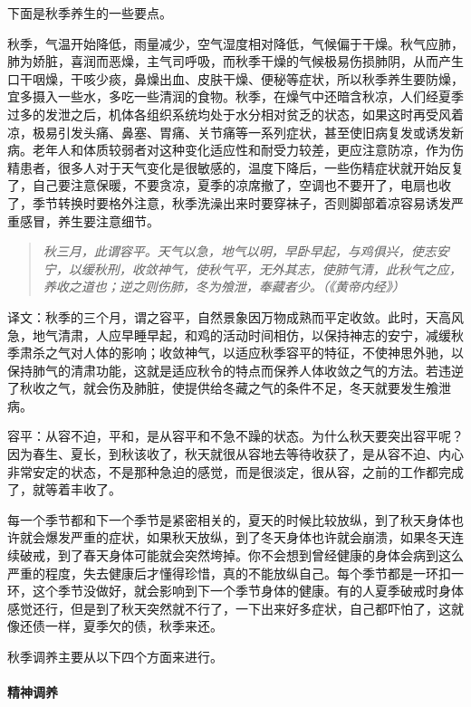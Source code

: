 下面是秋季养生的一些要点。

秋季，气温开始降低，雨量减少，空气湿度相对降低，气候偏于干燥。秋气应肺，肺为娇脏，喜润而恶燥，主气司呼吸，而秋季干燥的气候极易伤损肺阴，从而产生口干咽燥，干咳少痰，鼻燥出血、皮肤干燥、便秘等症状，所以秋季养生要防燥，宜多摄入一些水，多吃一些清润的食物。秋季，在燥气中还暗含秋凉，人们经夏季过多的发泄之后，机体各组织系统均处于水分相对贫乏的状态，如果这时再受风着凉，极易引发头痛、鼻塞、胃痛、关节痛等一系列症状，甚至使旧病复发或诱发新病。老年人和体质较弱者对这种变化适应性和耐受力较差，更应注意防凉，作为伤精患者，很多人对于天气变化是很敏感的，温度下降后，一些伤精症状就开始反复了，自己要注意保暖，不要贪凉，夏季的凉席撤了，空调也不要开了，电扇也收了，季节转换时要格外注意，秋季洗澡出来时要穿袜子，否则脚部着凉容易诱发严重感冒，养生要注意细节。

\begin{quote}\it
    秋三月，此谓容平。天气以急，地气以明，早卧早起，与鸡俱兴，使志安宁，以缓秋刑，收敛神气，使秋气平，无外其志，使肺气清，此秋气之应，养收之道也；逆之则伤肺，冬为飧泄，奉藏者少。（《黄帝内经》）
\end{quote}

译文：秋季的三个月，谓之容平，自然景象因万物成熟而平定收敛。此时，天高风急，地气清肃，人应早睡早起，和鸡的活动时间相仿，以保持神志的安宁，减缓秋季肃杀之气对人体的影响；收敛神气，以适应秋季容平的特征，不使神思外驰，以保持肺气的清肃功能，这就是适应秋令的特点而保养人体收敛之气的方法。若违逆了秋收之气，就会伤及肺脏，使提供给冬藏之气的条件不足，冬天就要发生飧泄病。

容平：从容不迫，平和，是从容平和不急不躁的状态。为什么秋天要突出容平呢？因为春生、夏长，到秋该收了，秋天就很从容地去等待收获了，是从容不迫、内心非常安定的状态，不是那种急迫的感觉，而是很淡定，很从容，之前的工作都完成了，就等着丰收了。

每一个季节都和下一个季节是紧密相关的，夏天的时候比较放纵，到了秋天身体也许就会爆发严重的症状，如果秋天放纵，到了冬天身体也许就会崩溃，如果冬天连续破戒，到了春天身体可能就会突然垮掉。你不会想到曾经健康的身体会病到这么严重的程度，失去健康后才懂得珍惜，真的不能放纵自己。每个季节都是一环扣一环，这个季节没做好，就会影响到下一个季节身体的健康。有的人夏季破戒时身体感觉还行，但是到了秋天突然就不行了，一下出来好多症状，自己都吓怕了，这就像还债一样，夏季欠的债，秋季来还。

秋季调养主要从以下四个方面来进行。

\paragraph{精神调养}

